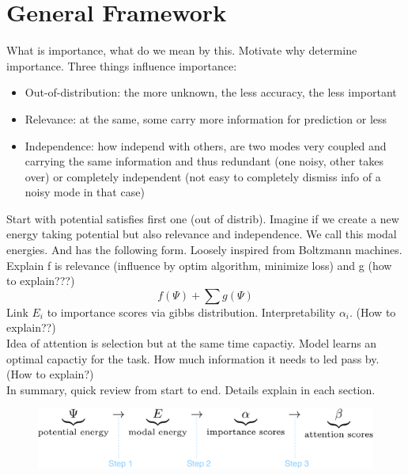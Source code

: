 \section{General Framework}

What is importance, what do we mean by this. Motivate why determine importance. Three things influence importance:
\begin{itemize}
\item Out-of-distribution: the more unknown, the less accuracy, the less important
\item Relevance: at the same, some carry more information for prediction or less
\item Independence: how independ with others, are two modes very coupled and carrying the same information and thus redundant (one noisy, other takes over) or completely independent (not easy to completely dismiss info of a noisy mode in that case)
\end{itemize}
Start with potential satisfies first one (out of distrib). Imagine if we create a new energy taking potential but also relevance and independence. We call this modal energies. And has the following form. Loosely inspired from Boltzmann machines. Explain f is relevance (influence by optim algorithm, minimize loss) and g (how to explain???)
$$f(\Psi) + \sum g(\Psi)$$
\indent Link $E_i$ to importance scores via gibbs distribution. Interpretability $\alpha_i$. (How to explain??)\\
Idea of attention is selection but at the same time capactiy. Model learns an optimal capactiy for the task. How much information it needs to led pass by. (How to explain?) \\

In summary, quick review from start to end. Details explain in each section.
\begin{figure}[!ht]
\centering
\includegraphics[scale=0.4]{figures/framework}
\end{figure}


